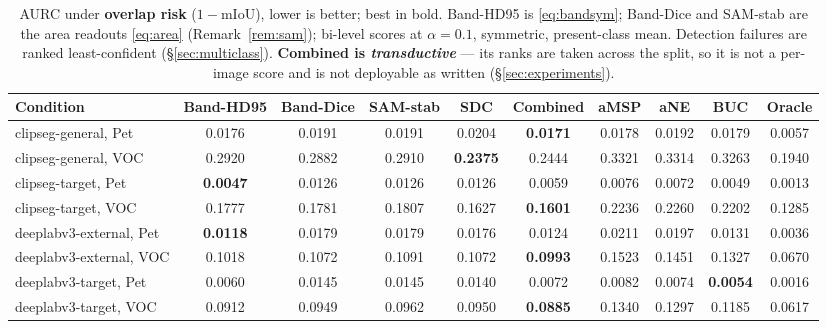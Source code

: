 \documentclass[11pt]{article}
\theoremstyle{remark}
\begin{document}
\begin{table}[t]
\centering
\small
\caption{AURC under \textbf{overlap risk} ($1-\mathrm{mIoU}$), lower is better;
best in bold. Band-HD95 is \eqref{eq:bandsym}; Band-Dice and SAM-stab are the area
readouts \eqref{eq:area} (Remark~\ref{rem:sam}); bi-level scores at $\alpha=0.1$,
symmetric, present-class mean. Detection failures are ranked least-confident
(\S\ref{sec:multiclass}). \textbf{Combined is \emph{transductive}} --- its ranks are
taken across the split, so it is not a per-image score and is not deployable as written
(\S\ref{sec:experiments}).}
\label{tab:overlap}
\begin{tabular}{lccccccccc}
\toprule
Condition & Band-HD95 & Band-Dice & SAM-stab & SDC & Combined & aMSP & aNE & BUC & Oracle \\
\midrule
clipseg-general, Pet     & 0.0176 & 0.0191 & 0.0191 & 0.0204 & \textbf{0.0171} & 0.0178 & 0.0192 & 0.0179 & 0.0057 \\
clipseg-general, VOC     & 0.2920 & 0.2882 & 0.2910 & \textbf{0.2375} & 0.2444 & 0.3321 & 0.3314 & 0.3263 & 0.1940 \\
clipseg-target, Pet      & \textbf{0.0047} & 0.0126 & 0.0126 & 0.0126 & 0.0059 & 0.0076 & 0.0072 & 0.0049 & 0.0013 \\
clipseg-target, VOC      & 0.1777 & 0.1781 & 0.1807 & 0.1627 & \textbf{0.1601} & 0.2236 & 0.2260 & 0.2202 & 0.1285 \\
deeplabv3-external, Pet  & \textbf{0.0118} & 0.0179 & 0.0179 & 0.0176 & 0.0124 & 0.0211 & 0.0197 & 0.0131 & 0.0036 \\
deeplabv3-external, VOC  & 0.1018 & 0.1072 & 0.1091 & 0.1072 & \textbf{0.0993} & 0.1523 & 0.1451 & 0.1327 & 0.0670 \\
deeplabv3-target, Pet    & 0.0060 & 0.0145 & 0.0145 & 0.0140 & 0.0072 & 0.0082 & 0.0074 & \textbf{0.0054} & 0.0016 \\
deeplabv3-target, VOC    & 0.0912 & 0.0949 & 0.0962 & 0.0950 & \textbf{0.0885} & 0.1340 & 0.1297 & 0.1185 & 0.0617 \\
\bottomrule
\end{tabular}
\end{table}
\end{document}
